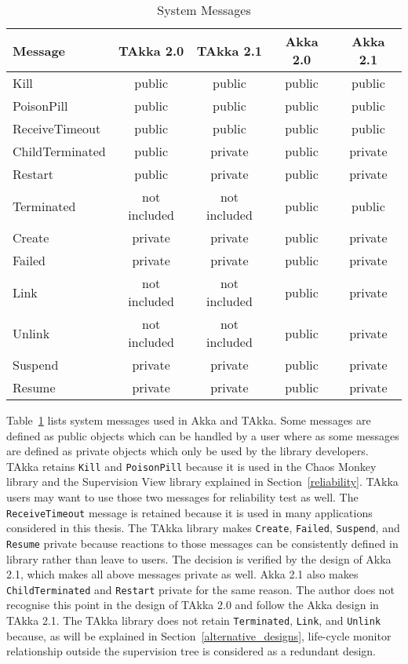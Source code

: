 \begin{table}[h]
\begin{center}
\begin{tabular}{| l | c | c | c | c |}
  \hline
  Message & TAkka 2.0 & TAkka 2.1 & Akka 2.0 & Akka 2.1 \\
  \hline
  Kill  & public & public & public & public \\
  \hline
  PoisonPill & public & public & public & public \\
  \hline
  ReceiveTimeout & public & public & public & public \\
  \hline
  ChildTerminated & public & private & public & private \\
  \hline
  Restart & public & private & public & private \\
  \hline
  Terminated & not included & not included & public & public \\
  \hline
  Create  & private & private & public & private \\
  \hline
  Failed  & private & private & public & private \\
  \hline
  Link  & not included & not included & public & private \\
  \hline  
  Unlink  & not included & not included & public & private \\
  \hline 
  Suspend  & private & private & public & private \\
  \hline
  Resume  & private & private & public & private \\
  \hline
\end{tabular}
\end{center}
\caption{System Messages}
\label{system_messages}
\end{table}

Table~\ref{system_messages} lists system messages used in Akka and TAkka.
Some messages are defined as public objects which can be handled by a user where
as some messages are defined as private objects which only be used by the
library developers.  TAkka retains {\tt Kill} and {\tt PoisonPill} because it is used
in the Chaos Monkey library and the Supervision View 
library explained in Section~\ref{reliability}.  TAkka users may want to use those two messages for
reliability test as well.  The {\tt ReceiveTimeout} message is retained because it is used in many 
applications considered in this thesis.  The TAkka library makes {\tt Create}, {\tt Failed}, {\tt Suspend}, 
and {\tt Resume} private because reactions to those messages can be consistently defined
in library rather than leave to users.  The decision is verified by the design
of Akka 2.1, which makes all above messages private as well.  Akka 2.1 also makes
{\tt ChildTerminated} and {\tt Restart} private for the same reason.  The author
does not recognise this point in the design of TAkka 2.0 and follow the Akka design
in TAkka 2.1.  The TAkka library does not retain {\tt Terminated}, {\tt Link}, and {\tt Unlink} because, as will be explained in 
Section~\ref{alternative_designs}, life-cycle monitor relationship outside the 
supervision tree is considered as a redundant design.

